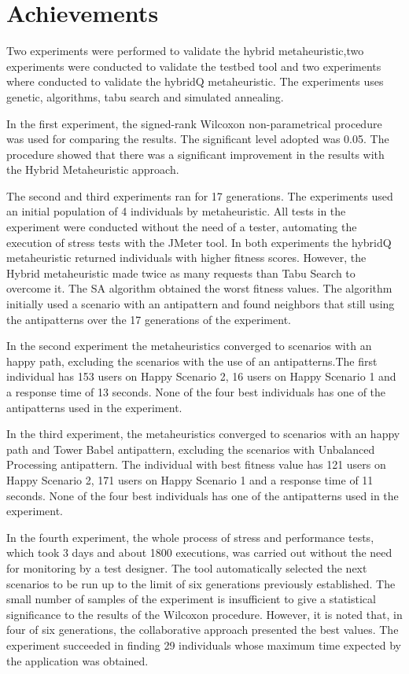 \documentclass{report}
\begin{document}
\section{Achievements}

Two experiments were performed to validate the hybrid metaheuristic,two experiments were conducted to validate the testbed tool and two experiments where conducted to validate the hybridQ metaheuristic. The experiments uses genetic, algorithms, tabu search and simulated annealing. 
 
In the first experiment, the signed-rank Wilcoxon non-parametrical procedure was used for comparing the results. The significant level adopted was 0.05. The procedure showed that there was a significant improvement in the results with the Hybrid Metaheuristic approach.

The second and third experiments ran for 17 generations. The experiments used an initial population of 4 individuals by metaheuristic. All tests in the experiment were conducted without the need of a tester, automating the execution of stress tests with the JMeter tool. In both experiments the hybridQ metaheuristic returned individuals with higher fitness scores. However, the Hybrid metaheuristic made twice as many requests than Tabu Search to overcome it. The SA algorithm obtained the worst fitness values. The algorithm initially used a scenario with an antipattern and found neighbors that still using the antipatterns over the 17 generations of the experiment.

In the second experiment the metaheuristics converged to scenarios with an happy path, excluding the scenarios with the use of an antipatterns.The first individual has 153 users on Happy Scenario 2, 16 users on Happy Scenario 1 and a response time of 13 seconds. None of the four best individuals has one of the antipatterns used in the experiment.


In the third experiment,  the metaheuristics converged to scenarios with an happy path and Tower Babel antipattern, excluding the scenarios with Unbalanced Processing antipattern.  The individual with best fitness value has 121 users on Happy Scenario 2, 171 users on Happy Scenario 1 and a response time of 11 seconds. None of the four best individuals has one of the antipatterns used in the experiment.


In the fourth experiment, the whole process of stress and performance tests, which took 3 days and about 1800 executions, was carried out without the need for monitoring by a test designer. The tool automatically selected the next scenarios to be run up to the limit of six generations previously established. The small number of samples of the experiment is insufficient to give a statistical significance to the results of the Wilcoxon procedure. However, it is noted that, in four of six generations, the collaborative approach presented the best values. The experiment succeeded in finding 29 individuals whose maximum time expected by the application was obtained. 
\end{document}
